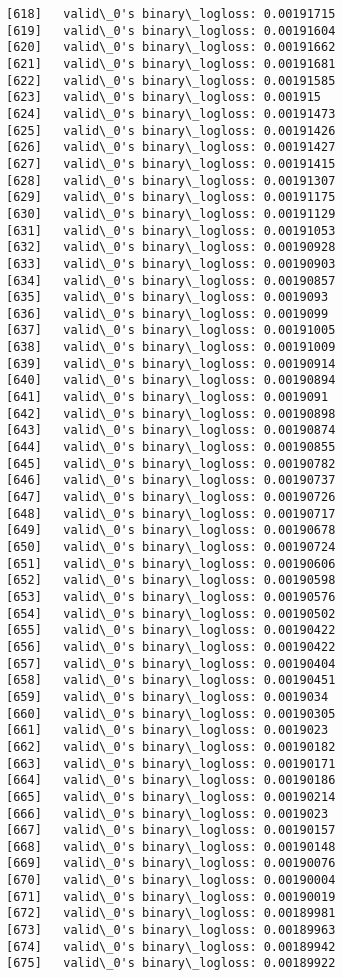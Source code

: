 \documentclass[11pt]{article}
\begin{document}
\begin{Verbatim}[commandchars=\\\{\}]
[618]	valid\_0's binary\_logloss: 0.00191715
[619]	valid\_0's binary\_logloss: 0.00191604
[620]	valid\_0's binary\_logloss: 0.00191662
[621]	valid\_0's binary\_logloss: 0.00191681
[622]	valid\_0's binary\_logloss: 0.00191585
[623]	valid\_0's binary\_logloss: 0.001915
[624]	valid\_0's binary\_logloss: 0.00191473
[625]	valid\_0's binary\_logloss: 0.00191426
[626]	valid\_0's binary\_logloss: 0.00191427
[627]	valid\_0's binary\_logloss: 0.00191415
[628]	valid\_0's binary\_logloss: 0.00191307
[629]	valid\_0's binary\_logloss: 0.00191175
[630]	valid\_0's binary\_logloss: 0.00191129
[631]	valid\_0's binary\_logloss: 0.00191053
[632]	valid\_0's binary\_logloss: 0.00190928
[633]	valid\_0's binary\_logloss: 0.00190903
[634]	valid\_0's binary\_logloss: 0.00190857
[635]	valid\_0's binary\_logloss: 0.0019093
[636]	valid\_0's binary\_logloss: 0.0019099
[637]	valid\_0's binary\_logloss: 0.00191005
[638]	valid\_0's binary\_logloss: 0.00191009
[639]	valid\_0's binary\_logloss: 0.00190914
[640]	valid\_0's binary\_logloss: 0.00190894
[641]	valid\_0's binary\_logloss: 0.0019091
[642]	valid\_0's binary\_logloss: 0.00190898
[643]	valid\_0's binary\_logloss: 0.00190874
[644]	valid\_0's binary\_logloss: 0.00190855
[645]	valid\_0's binary\_logloss: 0.00190782
[646]	valid\_0's binary\_logloss: 0.00190737
[647]	valid\_0's binary\_logloss: 0.00190726
[648]	valid\_0's binary\_logloss: 0.00190717
[649]	valid\_0's binary\_logloss: 0.00190678
[650]	valid\_0's binary\_logloss: 0.00190724
[651]	valid\_0's binary\_logloss: 0.00190606
[652]	valid\_0's binary\_logloss: 0.00190598
[653]	valid\_0's binary\_logloss: 0.00190576
[654]	valid\_0's binary\_logloss: 0.00190502
[655]	valid\_0's binary\_logloss: 0.00190422
[656]	valid\_0's binary\_logloss: 0.00190422
[657]	valid\_0's binary\_logloss: 0.00190404
[658]	valid\_0's binary\_logloss: 0.00190451
[659]	valid\_0's binary\_logloss: 0.0019034
[660]	valid\_0's binary\_logloss: 0.00190305
[661]	valid\_0's binary\_logloss: 0.0019023
[662]	valid\_0's binary\_logloss: 0.00190182
[663]	valid\_0's binary\_logloss: 0.00190171
[664]	valid\_0's binary\_logloss: 0.00190186
[665]	valid\_0's binary\_logloss: 0.00190214
[666]	valid\_0's binary\_logloss: 0.0019023
[667]	valid\_0's binary\_logloss: 0.00190157
[668]	valid\_0's binary\_logloss: 0.00190148
[669]	valid\_0's binary\_logloss: 0.00190076
[670]	valid\_0's binary\_logloss: 0.00190004
[671]	valid\_0's binary\_logloss: 0.00190019
[672]	valid\_0's binary\_logloss: 0.00189981
[673]	valid\_0's binary\_logloss: 0.00189963
[674]	valid\_0's binary\_logloss: 0.00189942
[675]	valid\_0's binary\_logloss: 0.00189922

\end{Verbatim}
\end{document}
